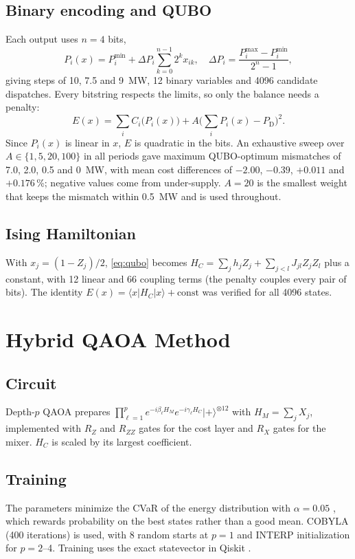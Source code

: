 \documentclass[conference]{IEEEtran}
\newcommand{\PD}{P_{\mathrm{D}}}
\begin{document}
\subsection{Binary encoding and QUBO}
Each output uses $n = 4$ bits,
\begin{equation}
P_i(x) = P_i^{\min} + \Delta P_i \sum_{k=0}^{n-1} 2^k x_{ik},\quad \Delta P_i = \frac{P_i^{\max} - P_i^{\min}}{2^n - 1},
\label{eq:enc}
\end{equation}
giving steps of 10, 7.5 and 9~MW, 12 binary variables and 4096 candidate dispatches. Every bitstring respects the limits, so only the balance needs a penalty:
\begin{equation}
E(x) = \sum_{i} C_i\big(P_i(x)\big) + A\Big(\sum_i P_i(x) - \PD\Big)^2.
\label{eq:qubo}
\end{equation}
Since $P_i(x)$ is linear in $x$, $E$ is quadratic in the bits. An exhaustive sweep over $A \in \{1, 5, 20, 100\}$ in all periods gave maximum QUBO-optimum mismatches of 7.0, 2.0, 0.5 and 0~MW, with mean cost differences of $-2.00$, $-0.39$, $+0.011$ and $+0.176$\,\%; negative values come from under-supply. $A = 20$ is the smallest weight that keeps the mismatch within 0.5~MW and is used throughout.

\subsection{Ising Hamiltonian}
With $x_j = (1 - Z_j)/2$, \eqref{eq:qubo} becomes $H_C = \sum_j h_j Z_j + \sum_{j<l} J_{jl} Z_jZ_l$ plus a constant, with 12 linear and 66 coupling terms (the penalty couples every pair of bits). The identity $E(x) = \langle x|H_C|x\rangle + \text{const}$ was verified for all 4096 states.

\section{Hybrid QAOA Method}
\subsection{Circuit}
Depth-$p$ QAOA prepares $\prod_{\ell=1}^{p} e^{-i\beta_\ell H_M} e^{-i\gamma_\ell H_C}|+\rangle^{\otimes 12}$ with $H_M = \sum_j X_j$, implemented with $R_Z$ and $R_{ZZ}$ gates for the cost layer and $R_X$ gates for the mixer. $H_C$ is scaled by its largest coefficient.

\subsection{Training}
The parameters minimize the CVaR of the energy distribution with $\alpha = 0.05$ \cite{barkoutsos2020}, which rewards probability on the best states rather than a good mean. COBYLA (400 iterations) is used, with 8 random starts at $p = 1$ and INTERP initialization \cite{zhou2020} for $p = 2$--4. Training uses the exact statevector in Qiskit \cite{qiskit}.
\end{document}
